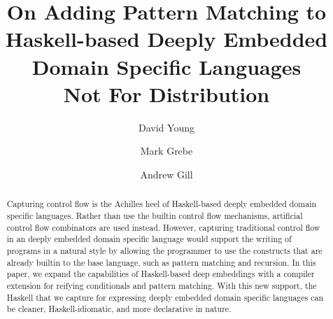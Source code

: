 \documentclass[sigplan,anonymous,review]{acmart}
\begin{document}
\title{On Adding Pattern Matching to Haskell-based
  Deeply Embedded Domain Specific Languages\\
\large{Not For Distribution}}

\author{David Young}


\author{Mark Grebe}

\author{Andrew Gill}

\renewcommand{\shortauthors}{Young, Grebe and Gill}

\begin{abstract}
  Capturing control flow is the Achilles heel of Haskell-based
  deeply embedded domain specific languages.
  Rather than use
  the builtin control flow mechanisms, artificial control flow combinators
  are used instead.
  However, capturing traditional control flow in an deeply embedded domain specific language
  would support the writing of programs in a natural style by allowing the programmer to use the
  constructs that are already builtin to the base language, such as pattern
  matching and recursion.
  In this paper, we expand the capabilities of
  Haskell-based deep embeddings with a compiler extension
  for reifying conditionals and pattern matching.
  With this new support, the Haskell that we capture for expressing
  deeply embedded domain specific languages can be cleaner, Haskell-idiomatic,
  and more declarative in nature.

\end{abstract}
\end{document}
